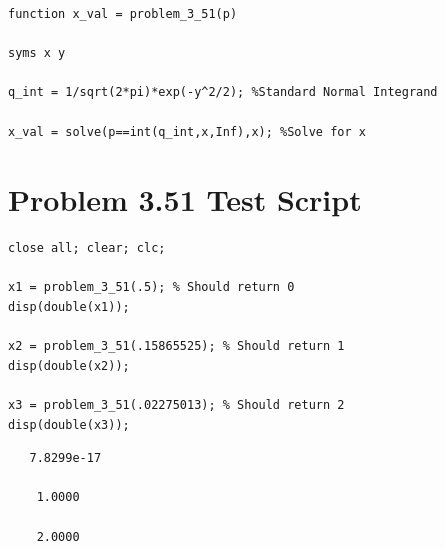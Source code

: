 \documentclass[12pt]{article}
\begin{document}
\begin{verbatim}
function x_val = problem_3_51(p)

syms x y

q_int = 1/sqrt(2*pi)*exp(-y^2/2); %Standard Normal Integrand

x_val = solve(p==int(q_int,x,Inf),x); %Solve for x
\end{verbatim}
    
\section*{Problem 3.51 Test Script}

\begin{verbatim}
close all; clear; clc;

x1 = problem_3_51(.5); % Should return 0
disp(double(x1));

x2 = problem_3_51(.15865525); % Should return 1
disp(double(x2));

x3 = problem_3_51(.02275013); % Should return 2
disp(double(x3));
\end{verbatim}

        \color{lightgray} \begin{verbatim}   7.8299e-17

    1.0000

    2.0000

\end{verbatim} \color{black}
    
\end{document}
